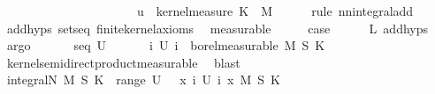 \begin{isabellebody}
\ \ \ \ \ \ \ \ \ \ \ \ \ \ \ \ \ {\isacharplus}{\kern0pt}\ {\isacharparenleft}{\kern0pt}{\isasymintegral}\isactrlsup {\isacharplus}{\kern0pt}\ {\isasymomega}\ {\isasymintegral}\isactrlsup {\isacharplus}{\kern0pt}\ {\isasymomega}\ u\ {\isacharparenleft}{\kern0pt}{\isasymomega}\ {\isasymomega}kernel{\isacharunderscore}{\kern0pt}measure\ K\ {\isasymomega}\ {\isasympartial}M{\isacharparenright}{\kern0pt}{\isachardoublequoteclose}\isanewline
\ \ \ \ \isamarkupfalse%
\ {\isacharparenleft}{\kern0pt}rule\ nn{\isacharunderscore}{\kern0pt}integral{\isacharunderscore}{\kern0pt}add{\isacharparenright}{\kern0pt}\isanewline
\ \ \ \ \isamarkupfalse%
\ add{\isachardot}{\kern0pt}hyps{\isacharparenleft}{\kern0pt}{}{\isacharcomma}{\kern0pt}{}{\isacharparenright}{\kern0pt}\ sets{\isacharunderscore}{\kern0pt}eq\ finite{\isacharunderscore}{\kern0pt}kernel{\isacharunderscore}{\kern0pt}axioms\ \isamarkupfalse%
\ measurable\isanewline
\ \ \isamarkupfalse%
\ \isamarkupfalse%
\ {\isacharquery}{\kern0pt}case\isanewline
\ \ \ \ \isamarkupfalse%
\ L\ add{\isachardot}{\kern0pt}hyps{\isacharparenleft}{\kern0pt}{}{\isacharcomma}{\kern0pt}{}{\isacharparenright}{\kern0pt}\ \isamarkupfalse%
\ argo\isanewline
\ \ \isamarkupfalse%
\isanewline
\ \ \isamarkupfalse%
\ {\isacharparenleft}{\kern0pt}seq\ U{\isacharparenright}{\kern0pt}\isanewline
\ \ \isamarkupfalse%
\ \isamarkupfalse%
\ {}{\isacharcolon}{\kern0pt}\ {\isachardoublequoteopen}{\isasymAnd}i{\isachardot}{\kern0pt}\ U\ i\ {\isasymin}\ borel{\isacharunderscore}{\kern0pt}measurable\ {\isacharparenleft}{\kern0pt}M\ {\isasymOtimes}\isactrlsub S\ K{\isacharparenright}{\kern0pt}{\isachardoublequoteclose}\isanewline
\ \ \ \ \isamarkupfalse%
\ kernel{\isacharunderscore}{\kern0pt}semidirect{\isacharunderscore}{\kern0pt}product{\isacharunderscore}{\kern0pt}measurable\ \isamarkupfalse%
\ blast\isanewline
\ \ \isamarkupfalse%
\ {\isachardoublequoteopen}integral\isactrlsup N\ {\isacharparenleft}{\kern0pt}M\ {\isasymOtimes}\isactrlsub S\ K{\isacharparenright}{\kern0pt}\ {\isacharparenleft}{\kern0pt}{\isasymSqunion}\ range\ U{\isacharparenright}{\kern0pt}\ {\isacharequal}{\kern0pt}\ {\isasymintegral}\isactrlsup {\isacharplus}{\kern0pt}\ x{\isachardot}{\kern0pt}\ {\isacharparenleft}{\kern0pt}{\isasymSqunion}i{\isachardot}{\kern0pt}\ U\ i\ x{\isacharparenright}{\kern0pt}\ {\isasympartial}{\isacharparenleft}{\kern0pt}M\ {\isasymOtimes}\isactrlsub S\ K{\isacharparenright}{\kern0pt}{\isachardoublequoteclose}\isanewline

\end{isabellebody}
